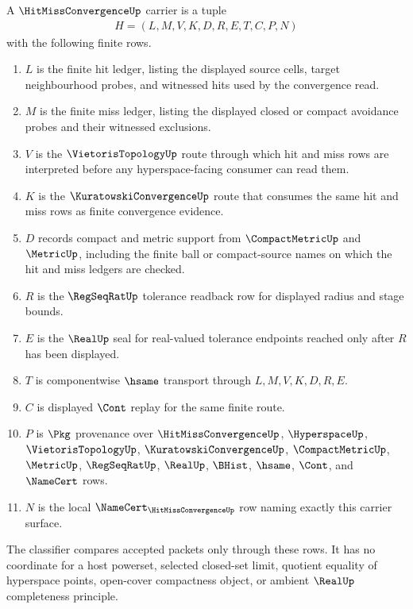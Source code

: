 \begin{definition}
\label{def:hit-miss-convergence-carrier}
A $\HitMissConvergenceUp$ carrier is a tuple
$$
\begin{gathered}
H=(L,M,V,K,D,R,E,T,C,P,N)
\end{gathered}
$$
with the following finite rows.
\begin{enumerate}
\item $L$ is the finite hit ledger, listing the displayed source cells, target neighbourhood probes, and witnessed hits used by the convergence read.
\item $M$ is the finite miss ledger, listing the displayed closed or compact avoidance probes and their witnessed exclusions.
\item $V$ is the $\VietorisTopologyUp$ route through which hit and miss rows are interpreted before any hyperspace-facing consumer can read them.
\item $K$ is the $\KuratowskiConvergenceUp$ route that consumes the same hit and miss rows as finite convergence evidence.
\item $D$ records compact and metric support from $\CompactMetricUp$ and $\MetricUp$, including the finite ball or compact-source names on which the hit and miss ledgers are checked.
\item $R$ is the $\RegSeqRatUp$ tolerance readback row for displayed radius and stage bounds.
\item $E$ is the $\RealUp$ seal for real-valued tolerance endpoints reached only after $R$ has been displayed.
\item $T$ is componentwise $\hsame$ transport through $L,M,V,K,D,R,E$.
\item $C$ is displayed $\Cont$ replay for the same finite route.
\item $P$ is $\Pkg$ provenance over $\HitMissConvergenceUp$, $\HyperspaceUp$, $\VietorisTopologyUp$, $\KuratowskiConvergenceUp$, $\CompactMetricUp$, $\MetricUp$, $\RegSeqRatUp$, $\RealUp$, $\BHist$, $\hsame$, $\Cont$, and $\NameCert$ rows.
\item $N$ is the local $\NameCert_{\HitMissConvergenceUp}$ row naming exactly this carrier surface.
\end{enumerate}
The classifier compares accepted packets only through these rows. It has no coordinate for a host powerset, selected closed-set limit, quotient equality of hyperspace points, open-cover compactness object, or ambient $\RealUp$ completeness principle.
\end{definition}

